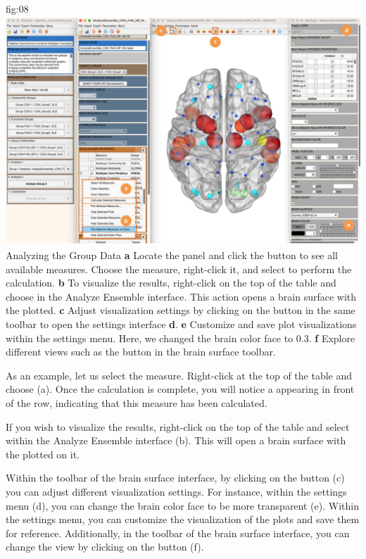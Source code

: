 \documentclass[justified]{tufte-handout}
\begin{document}
	{fig:08}
	{\includegraphics{fig08.jpg}}
	{Analyzing the Group Data}
	{
	{\bf a} Locate the  panel and click the  button to see all available measures. Choose the  measure, right-click it, and select  to perform the calculation.
	{\bf b} To visualize the results, right-click on the top of the table and choose  in the Analyze Ensemble interface. This action opens a brain surface with the  plotted.
	{\bf c} Adjust visualization settings by clicking on the  button in the same toolbar to open the settings interface {\bf d}.
	{\bf e} Customize and save plot visualizations within the settings menu. Here, we changed the brain color face to 0.3.
 	{\bf f} Explore different views such as the  button in the brain surface toolbar.
	}

 
As an example, let us select the  measure. Right-click at the top of the table and choose  (a). Once the calculation is complete, you will notice a  appearing in front of the  row, indicating that this measure has been calculated.

If you wish to visualize the results, right-click on the top of the table and select  within the Analyze Ensemble interface (b). This will open a brain surface with the  plotted on it.

Within the toolbar of the brain surface interface, by clicking on the  button (c) you can adjust different visualization settings.
For instance, within the settings menu (d), you can change the brain color face to be more transparent (e). Within the settings menu, you can customize the visualization of the plots and save them for reference.
Additionally, in the toolbar of the brain surface interface, you can change the view by clicking on the  button (f). 
\end{document}
